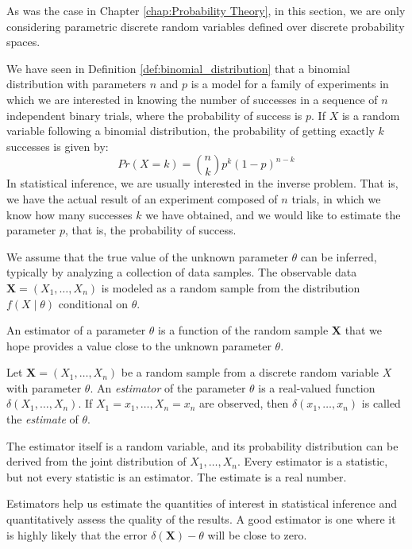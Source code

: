 As was the case in Chapter \ref{chap:Probability Theory}, in this section, we are only considering parametric discrete random variables defined over discrete probability spaces.

\begin{example}
We have seen in Definition \ref{def:binomial_distribution} that a binomial distribution with parameters $n$ and $p$ is a model for a family of experiments in which we are interested in knowing the number of successes in a sequence of $n$ independent binary trials, where the probability of success is $p$. If $X$ is a random variable following a binomial distribution, the probability of getting exactly $k$ successes is given by:
\[
Pr(X=k) = {\binom {n}{k}}p^{k}(1-p)^{n-k}
\]
In statistical inference, we are usually interested in the inverse problem. That is, we have the actual result of an experiment composed of $n$ trials, in which we know how many successes $k$ we have obtained, and we would like to estimate the parameter $p$, that is, the probability of success.
\end{example}

We assume that the true value of the unknown parameter $\theta$ can be inferred, typically by analyzing a collection of data samples. The observable data $\mathbf{X}=\left(X_{1},\ldots,X_{n}\right)$ is modeled as a random sample from the distribution $f\left(X \mid \theta \right)$ conditional on $\theta$.

An estimator of a parameter $\theta$ is a function of the random sample $\mathbf{X}$ that we hope provides a value close to the unknown parameter $\theta$.

\begin{definition}
Let $\mathbf{X}=\left(X_{1},\ldots,X_{n}\right)$ be a random sample from a discrete random variable $X$ with parameter $\theta$. An \emph{estimator} of the parameter $\theta$ is a real-valued function $\delta\left( X_1, \ldots, X_n \right)$. If $X_1 = x_1, \ldots, X_n = x_n$ are observed, then $\delta\left( x_1, \ldots, x_n \right)$ is called the \emph{estimate} of $\theta$.
\end{definition}

The estimator itself is a random variable, and its probability distribution can be derived from the joint distribution of $X_1, \ldots, X_n$. Every estimator is a statistic, but not every statistic is an estimator. The estimate is a real number.

Estimators help us estimate the quantities of interest in statistical inference and quantitatively assess the quality of the results. A good estimator is one where it is highly likely that the error $\delta(\mathbf{X}) - \theta$ will be close to zero.

